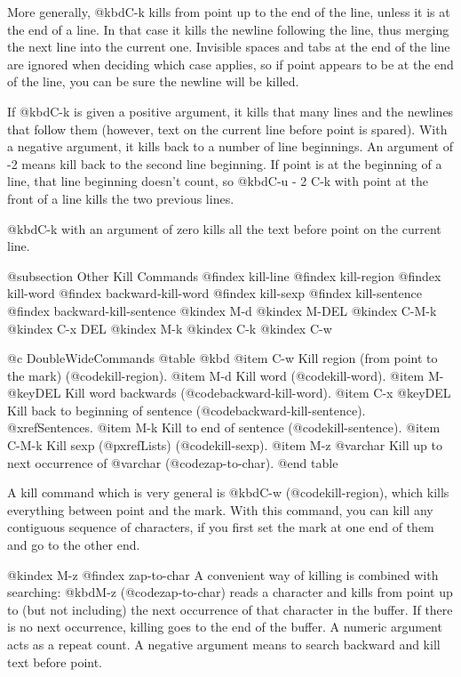 {{{{{{{  More generally, @kbd{C-k} kills from point up to the end of the line,
unless it is at the end of a line.  In that case it kills the newline
following the line, thus merging the next line into the current one.
Invisible spaces and tabs at the end of the line are ignored when deciding
which case applies, so if point appears to be at the end of the line, you
can be sure the newline will be killed.

  If @kbd{C-k} is given a positive argument, it kills that many lines and
the newlines that follow them (however, text on the current line before
point is spared).  With a negative argument, it kills back to a number of
line beginnings.  An argument of -2 means kill back to the second line
beginning.  If point is at the beginning of a line, that line beginning
doesn't count, so @kbd{C-u - 2 C-k} with point at the front of a line kills
the two previous lines.

  @kbd{C-k} with an argument of zero kills all the text before point on the
current line.

@subsection Other Kill Commands
@findex kill-line
@findex kill-region
@findex kill-word
@findex backward-kill-word
@findex kill-sexp
@findex kill-sentence
@findex backward-kill-sentence
@kindex M-d
@kindex M-DEL
@kindex C-M-k
@kindex C-x DEL
@kindex M-k
@kindex C-k
@kindex C-w

@c DoubleWideCommands
@table @kbd
@item C-w
Kill region (from point to the mark) (@code{kill-region}).
@item M-d
Kill word (@code{kill-word}).
@item M-@key{DEL}
Kill word backwards (@code{backward-kill-word}).
@item C-x @key{DEL}
Kill back to beginning of sentence (@code{backward-kill-sentence}).
@xref{Sentences}.
@item M-k
Kill to end of sentence (@code{kill-sentence}).
@item C-M-k
Kill sexp (@pxref{Lists}) (@code{kill-sexp}).
@item M-z @var{char}
Kill up to next occurrence of @var{char} (@code{zap-to-char}).
@end table

  A kill command which is very general is @kbd{C-w} (@code{kill-region}),
which kills everything between point and the mark.  With this command, you
can kill any contiguous sequence of characters, if you first set the mark
at one end of them and go to the other end.

@kindex M-z
@findex zap-to-char
  A convenient way of killing is combined with searching: @kbd{M-z}
(@code{zap-to-char}) reads a character and kills from point up to (but not
including) the next occurrence of that character in the buffer.  If there
is no next occurrence, killing goes to the end of the buffer.  A numeric
argument acts as a repeat count.  A negative argument means to search
backward and kill text before point.

}}}}}}}
